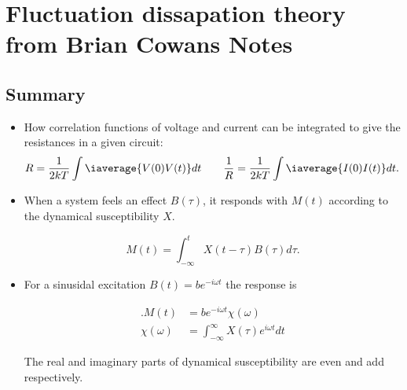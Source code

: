 \section{Fluctuation dissapation theory from Brian Cowans Notes}
\label{sec:fluctuationDissapation}

\subsection{Summary}
\begin{itemize}
\item  How  correlation  functions  of   voltage  and  current  can  be
  integrated to give the resistances in a given circuit:
  \[
    {R}                                                               =
    \frac{1}{2kT}\int\iaverage{V(0)V(t)}dt\qquad\frac{1}{R}=\frac{1}{2kT}\int\iaverage{I(0)I(t)}dt.
  \]
\item  When  a system  feels  an  effect $  B(\tau)  $,  it responds  with
  $ M(t) $ according to the dynamical susceptibility $ X $.

  \begin{framed}\noindent
    \begin{equation}\label{eqn:response_2}
      M(t) = \int_{-\infty}^{t}X(t - \tau)B(\tau)d\tau.
    \end{equation}
  \end{framed}
\item  For a  sinusidal  excitation  $ B(t)  =  be^{-i\omega  t} $  the
  response is
  \begin{framed}\noindent
    \begin{equation}\label{eqn:response_3}
      \begin{aligned}.M(t)    &=    be^{-i\omega   t}\chi(\omega)\\    \chi(\omega)    &=
        \int_{-\infty}^{\infty}X(\tau)e^{i\omega t}dt
      \end{aligned}
    \end{equation}
  \end{framed}

  The real and imaginary parts of dynamical susceptibility are even and
  add respectively.


\end{itemize}
